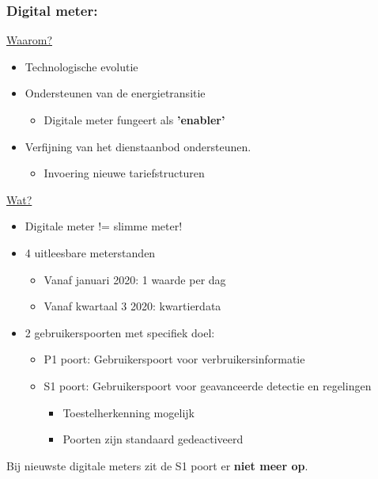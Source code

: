 \documentclass[12pt]{article}
\begin{document}
\subsubsection{Digital meter:}
\underline{Waarom?}
\begin{itemize}
    \item Technologische evolutie
    \item Ondersteunen van de energietransitie\begin{itemize}
        \item Digitale meter fungeert als \textbf{'enabler'}
    \end{itemize}
    \item Verfijning van het dienstaanbod ondersteunen.\begin{itemize}
        \item Invoering nieuwe tariefstructuren
    \end{itemize}
\end{itemize}
\underline{Wat?}
\begin{itemize}
    \item Digitale meter != slimme meter!
    \item 4 uitleesbare meterstanden\begin{itemize}
        \item Vanaf januari 2020: 1 waarde per dag 
        \item Vanaf kwartaal 3 2020: kwartierdata
    \end{itemize}
    \item 2 gebruikerspoorten met specifiek doel:\begin{itemize}
        \item P1 poort: Gebruikerspoort voor verbruikersinformatie
        \item S1 poort: Gebruikerspoort voor geavanceerde detectie en regelingen\begin{itemize}
            \item Toestelherkenning mogelijk
            \item Poorten zijn standaard gedeactiveerd
        \end{itemize}
    \end{itemize}
\end{itemize}
Bij nieuwste digitale meters zit de S1 poort er \textbf{niet meer op}.
\end{document}
